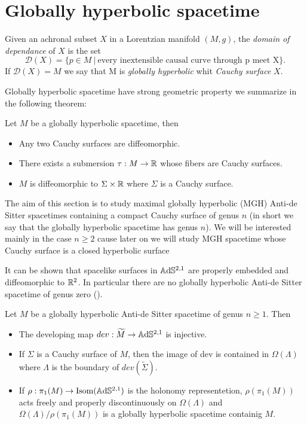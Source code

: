 \section{Globally hyperbolic spacetime}
\begin{definition}
    Given an achronal subset $X$ in a Lorentzian manifold $(M,g)$, the \textit{domain of dependance} of $X$ is the set
    \[
        \mathcal{D}(X)= \{ p \in M \ | \ \text{every inextensible causal curve through p meet X} \}.
    \]
    If $\mathcal{D}(X)=M$ we say that M is  \textit{globally hyperbolic} whit \textit{Cauchy surface} $X$.
\end{definition}
Globally hyperbolic spacetime have strong geometric property we summarize in the following theorem:
\begin{theorem}
    Let $M$ be a globally hyperbolic spacetime, then
    \begin{itemize}
        \item Any two Cauchy surfaces are diffeomorphic.
        \item There  exists a submersion $\tau : M \to \mathbb{R}$ whose fibers are Cauchy surfaces.
        \item $M$ is diffeomorphic to $\Sigma \times \mathbb{R}$ where $\Sigma$ is a Cauchy surface.
    \end{itemize}
\end{theorem}
The aim of this section is to study maximal globally hyperbolic (MGH) Anti-de Sitter spacetimes containing a compact Cauchy surface of genus $n$ (in short we say that the globally hyperbolic spacetime has genus $n$). We will be interested mainly in the case $n\geq 2$ cause later on we will study MGH spacetime whose Cauchy surface is a closed hyperbolic surface\\ 
\begin{observation}
    It can be shown that spacelike surfaces in $\mathbb{A}\mathrm{d}\mathbb{S}^{2,1}$ are properly embedded and diffeomorphic to $\mathbb{R}^2$.
    In particular there are no globally hyperbolic Anti-de Sitter spacetime of genus zero (\cite{bonsanteseppi}).
\end{observation}
\begin{proposition}
    Let $M$ be a globally hyperbolic Anti-de Sitter spacetime of genus $n\geq 1$. Then
    \begin{itemize}
        \item The developing map $dev: \widetilde{M} \to\mathbb{A}\mathrm{d}\mathbb{S}^{2,1}$ is injective.
        \item If $\Sigma$ is a Cauchy surface of $M$, then the image of dev is contained in $\Omega(\Lambda)$ where $\Lambda$ is the boundary of $dev(\widetilde{\Sigma})$.
        \item If $\rho : \pi_1(M) \to \text{Isom}(\mathbb{A}\mathrm{d}\mathbb{S}^{2,1})$ is the holonomy representetion, $\rho(\pi_1(M))$ acts freely and properly discontinuously on $\Omega(\Lambda)$ and $\Omega(\Lambda) / \rho(\pi_1(M))$ is a globally hyperbolic spacetime containig $M$.
    \end{itemize}
\end{proposition}
